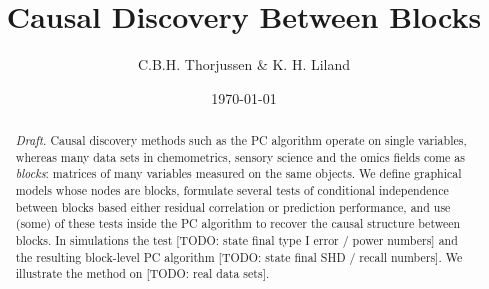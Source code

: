 \documentclass[10pt,leqno]{amsart}
\newcommand{\todo}[1]{{\color{red}[TODO: #1]}}
\begin{document}
\title{Causal Discovery Between Blocks} %
\author[Initial Surname]{C.B.H. Thorjussen \& K. H. Liland}
\date{\today}
\address{Telemarksforsking}
\maketitle

\let\thefootnote\relax
{} %

\begin{abstract}
\emph{Draft.} Causal discovery methods such as the PC algorithm operate on single
variables, whereas many data sets in chemometrics, sensory science and the
omics fields come as \emph{blocks}: matrices of many variables measured on the
same objects. We define graphical models whose nodes are blocks, formulate several tests of
conditional independence between blocks based either residual correlation or prediction performance, and use (some) of these tests inside the PC
algorithm to recover the causal structure between blocks. In simulations the test
\todo{state final type I error / power numbers} and the resulting block-level PC
algorithm \todo{state final SHD / recall numbers}. We illustrate the method on
\todo{real data sets}.
\end{abstract} %

\bigskip

\noindent

$\,$

$\,$
\end{document}
